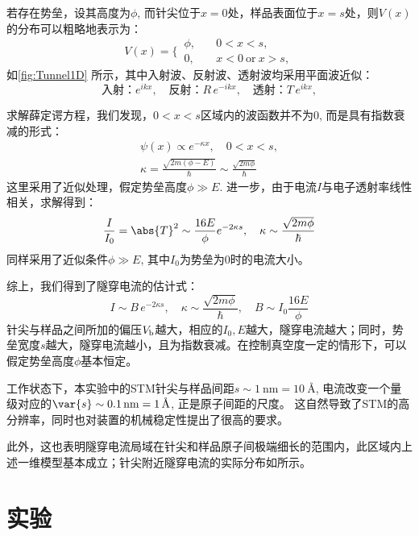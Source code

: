 \documentclass[a4paper]{article}
\begin{document}
若存在势垒，设其高度为$\phi$, 而针尖位于$x = 0$处，样品表面位于$x = s$处，则$V(x)$的分布可以粗略地表示为：
\begin{equation}
	V(x) = \Bigg\lbrace\,
	\begin{aligned}
		\phi, \quad& 0 < x < s,\\
		0, \quad& x < 0 \ \textrm{or}\  x > s, 
	\end{aligned}
\end{equation}
如\autoref{fig:Tunnel1D} 所示，其中入射波、反射波、透射波均采用平面波近似：
\begin{equation}
	\textit{入射：} e^{ikx},\quad
	\textit{反射：} R\,e^{-ikx},\quad
	\textit{透射：} T\,e^{ikx},
\end{equation}

求解薛定谔方程，我们发现，$0 < x < s$区域内的波函数并不为0, 而是具有指数衰减的形式：
\begin{gather}
	\psi(x) \propto e^{-\kappa x},\quad 0 < x < s,\\
	\kappa = \frac{\sqrt{2m(\phi - E)}}{\hbar}
		\sim \frac{\sqrt{2m\phi}}{\hbar}
\end{gather}
这里采用了近似处理，假定势垒高度$\phi \gg E$. 进一步，由于电流$I$与电子透射率线性相关，求解得到：
\begin{equation}
	\frac{I}{I_0} = \abs{T}^2
	\sim \frac{16E}{\phi} e^{-2\kappa s},\quad
	\kappa \sim \frac{\sqrt{2m\phi}}{\hbar}
\end{equation}
同样采用了近似条件$\phi \gg E$, 其中$I_0$为势垒为0时的电流大小。

综上，我们得到了隧穿电流的估计式：
\begin{equation}
	I \sim B\,e^{-2\kappa s},\quad
	\kappa \sim \frac{\sqrt{2m\phi}}{\hbar},\quad
	B \sim I_0 \frac{16E}{\phi}
	\label{eq:tunnelEq}
\end{equation}
针尖与样品之间所加的偏压$V_\textup{b}$越大，相应的$I_0, E$越大，隧穿电流越大；同时，势垒宽度$s$越大，隧穿电流越小，且为指数衰减。在控制真空度一定的情形下，可以假定势垒高度$\phi$基本恒定。

工作状态下，本实验中的STM针尖与样品间距$s \sim \SI{1}{\nm} = \SI{10}{\angstrom}$, 电流改变一个量级对应的$\var{s} \sim \SI{0.1}{\nm} = \SI{1}{\angstrom}$, 正是原子间距的尺度。
这自然导致了STM的高分辨率，同时也对装置的机械稳定性提出了很高的要求。
	
此外，这也表明隧穿电流局域在针尖和样品原子间极端细长的范围内，此区域内上述一维模型基本成立；针尖附近隧穿电流的实际分布如所示。
\newpage
\section{实验} \label{experiment}%
\end{document}
